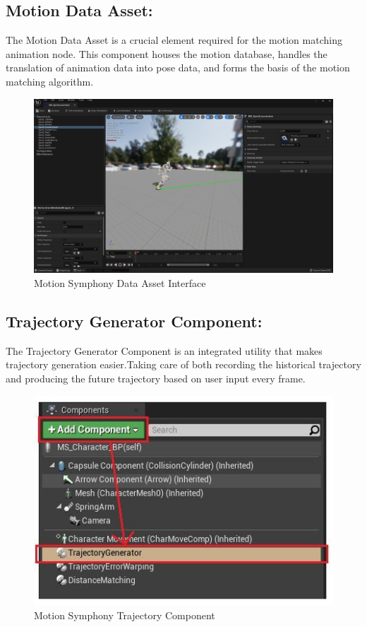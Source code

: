 \documentclass[12pt]{book}
\begin{document}
\subsection{Motion Data Asset:}
The Motion Data Asset is a crucial element required for the motion matching animation node.
This component houses the motion database, handles the translation of animation data into
pose data, and forms the basis of the motion matching algorithm.
\begin{figure}[!h]
    \centering
    \includegraphics[scale=0.3]{./Figures/Images/Motion Symphony/MotionDataEditorOverview.png}
    \caption{Motion Symphony Data Asset Interface}
    \label{Motion Symphony Data Asset Interface}
\end{figure}

\subsection{Trajectory Generator Component:}
The Trajectory Generator Component is an integrated utility that makes trajectory generation
easier.Taking care of both recording the historical trajectory and producing the future trajectory
based on user input every frame.
\begin{figure}[!h]
    \centering
    \includegraphics[scale=0.5]{./Figures/Images/Motion Symphony/AddTrajectoryGeneratorComponent.jpeg}
    \caption{Motion Symphony Trajectory Component}
    \label{Motion Symphony Trajectory Component}
\end{figure}
\end{document}
